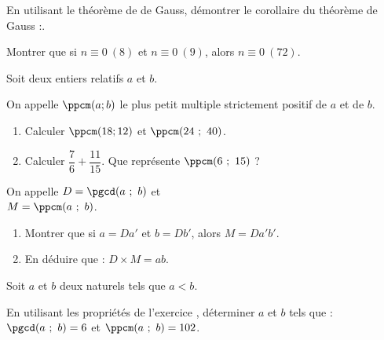 \begin{colonne*exercice}
\begin{exercice}
En utilisant le théorème de de Gauss, démontrer le corollaire du théorème de Gauss :.
\end{exercice}

\begin{exercice}
  Montrer que si $n\equiv0~(8)$ et $n\equiv0~(9)$, alors
  $n\equiv0~(72)$.
\end{exercice}

\begin{exercice}
  Soit deux entiers relatifs $a$ et $b$. 
  
  On appelle $\ppcm(a; b)$ le plus petit multiple strictement positif
  de $a$ et de $b$.
\begin{enumerate}
\item Calculer $\ppcm(18; 12)$ et $\ppcm(24\ ;\ 40)$.\vspace{5pt}
\item Calculer $\dfrac{7}{6}+\dfrac{11}{15}$. Que représente
  $\ppcm(6\ ;\ 15)$ ?
\end{enumerate}
\end{exercice}

\begin{exercice}\label{ExoPPCM}
On appelle $D = \pgcd(a\ ;\ b)$ et\\ $M = \ppcm(a\ ;\ b)$.
\begin{enumerate}
\item Montrer que si $a = Da'$ et $b = Db'$, alors $M = Da'b'$.
\item En déduire que : $D\times M = ab$.
\end{enumerate}
\end{exercice}

\begin{exercice}
Soit $a$ et $b$ deux naturels tels que $a < b$.

En utilisant les propriétés de l’exercice ,
déterminer $a$ et $b$ tels que : $\pgcd(a\ ;\ b)=6$ et
$\ppcm(a\ ;\ b)=102$.
\end{exercice}



\end{colonne*exercice}
